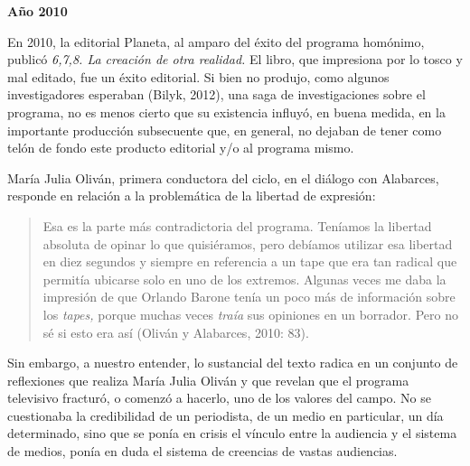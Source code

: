 \textbf{Año 2010}

En 2010, la editorial Planeta, al amparo del éxito del programa homónimo, publicó \emph{6,7,8. La creación de otra realidad.} El libro, que impresiona por lo tosco y mal editado, fue un éxito editorial. Si bien no produjo, como algunos investigadores esperaban (Bilyk, 2012), una saga de investigaciones sobre el programa, no es menos cierto que su existencia influyó, en buena medida, en la importante producción subsecuente que, en general, no dejaban de tener como telón de fondo este producto editorial y/o al programa mismo.

María Julia Oliván, primera conductora del ciclo, en el diálogo con Alabarces, responde en relación a la problemática de la libertad de expresión:

\begin{quote}
Esa es la parte más contradictoria del programa. Teníamos la libertad absoluta de opinar lo que quisiéramos, pero debíamos utilizar esa libertad en diez segundos y siempre en referencia a un tape que era tan radical que permitía ubicarse solo en uno de los extremos. Algunas veces me daba la impresión de que Orlando Barone tenía un poco más de información sobre los \emph{tapes,} porque muchas veces \emph{traía} sus opiniones en un borrador. Pero no sé si esto era así (Oliván y Alabarces, 2010: 83).
\end{quote}

Sin embargo, a nuestro entender, lo sustancial del texto radica en un conjunto de reflexiones que realiza María Julia Oliván y que revelan que el programa televisivo fracturó, o comenzó a hacerlo, uno de los valores del campo. No se cuestionaba la credibilidad de un periodista, de un medio en particular, un día determinado, sino que se ponía en crisis el vínculo entre la audiencia y el sistema de medios, ponía en duda el sistema de creencias de vastas audiencias.

